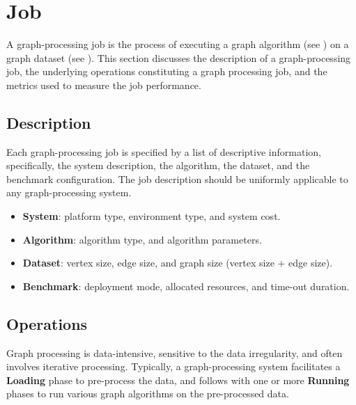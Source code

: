 









\section{Job}
\label{sec:def:job}
A graph-processing job is the process of executing a graph algorithm (see ) on a graph dataset (see ). This section discusses the description of a graph-processing job, the underlying operations constituting a graph processing job, and the metrics used to measure the job performance.

\subsection{Description}
Each graph-processing job is specified by a list of descriptive information, specifically, the system description, the algorithm, the dataset, and the benchmark configuration. The job description should be uniformly applicable to any graph-processing system.

\begin{itemize}
    \item \textbf{System}: platform type, environment type, and system cost.
    \item \textbf{Algorithm}: algorithm type, and algorithm parameters. 
    \item \textbf{Dataset}: vertex size, edge size, and graph size (vertex size + edge size).
    \item \textbf{Benchmark}: deployment mode, allocated resources, and time-out duration.
\end{itemize}


\subsection{Operations}
\label{sec:def:job:operation}
Graph processing is data-intensive, sensitive to the data irregularity, and often involves iterative processing. Typically, a graph-processing system facilitates a \textbf{Loading} phase to pre-process the data, and follows with one or more \textbf{Running} phases to run various graph algorithms on the pre-processed data.

